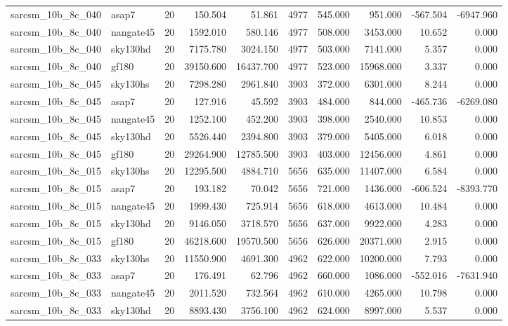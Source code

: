 \documentclass{article}
\begin{document}
\begin{longtable}{llrrrrrrrr}
sarcsm\_10b\_8c\_040 & asap7 & 20 & 150.504 & 51.861 & 4977 & 545.000 & 951.000 & -567.504 & -6947.960 \\
sarcsm\_10b\_8c\_040 & nangate45 & 20 & 1592.010 & 580.146 & 4977 & 508.000 & 3453.000 & 10.652 & 0.000 \\
sarcsm\_10b\_8c\_040 & sky130hd & 20 & 7175.780 & 3024.150 & 4977 & 503.000 & 7141.000 & 5.357 & 0.000 \\
sarcsm\_10b\_8c\_040 & gf180 & 20 & 39150.600 & 16437.700 & 4977 & 523.000 & 15968.000 & 3.337 & 0.000 \\
sarcsm\_10b\_8c\_045 & sky130hs & 20 & 7298.280 & 2961.840 & 3903 & 372.000 & 6301.000 & 8.244 & 0.000 \\
sarcsm\_10b\_8c\_045 & asap7 & 20 & 127.916 & 45.592 & 3903 & 484.000 & 844.000 & -465.736 & -6269.080 \\
sarcsm\_10b\_8c\_045 & nangate45 & 20 & 1252.100 & 452.200 & 3903 & 398.000 & 2540.000 & 10.853 & 0.000 \\
sarcsm\_10b\_8c\_045 & sky130hd & 20 & 5526.440 & 2394.800 & 3903 & 379.000 & 5405.000 & 6.018 & 0.000 \\
sarcsm\_10b\_8c\_045 & gf180 & 20 & 29264.900 & 12785.500 & 3903 & 403.000 & 12456.000 & 4.861 & 0.000 \\
sarcsm\_10b\_8c\_015 & sky130hs & 20 & 12295.500 & 4884.710 & 5656 & 635.000 & 11407.000 & 6.584 & 0.000 \\
sarcsm\_10b\_8c\_015 & asap7 & 20 & 193.182 & 70.042 & 5656 & 721.000 & 1436.000 & -606.524 & -8393.770 \\
sarcsm\_10b\_8c\_015 & nangate45 & 20 & 1999.430 & 725.914 & 5656 & 618.000 & 4613.000 & 10.484 & 0.000 \\
sarcsm\_10b\_8c\_015 & sky130hd & 20 & 9146.050 & 3718.570 & 5656 & 637.000 & 9922.000 & 4.283 & 0.000 \\
sarcsm\_10b\_8c\_015 & gf180 & 20 & 46218.600 & 19570.500 & 5656 & 626.000 & 20371.000 & 2.915 & 0.000 \\
sarcsm\_10b\_8c\_033 & sky130hs & 20 & 11550.900 & 4691.300 & 4962 & 622.000 & 10200.000 & 7.793 & 0.000 \\
sarcsm\_10b\_8c\_033 & asap7 & 20 & 176.491 & 62.796 & 4962 & 660.000 & 1086.000 & -552.016 & -7631.940 \\
sarcsm\_10b\_8c\_033 & nangate45 & 20 & 2011.520 & 732.564 & 4962 & 610.000 & 4265.000 & 10.798 & 0.000 \\
sarcsm\_10b\_8c\_033 & sky130hd & 20 & 8893.430 & 3756.100 & 4962 & 624.000 & 8997.000 & 5.537 & 0.000 \\

\end{longtable}
\end{document}
